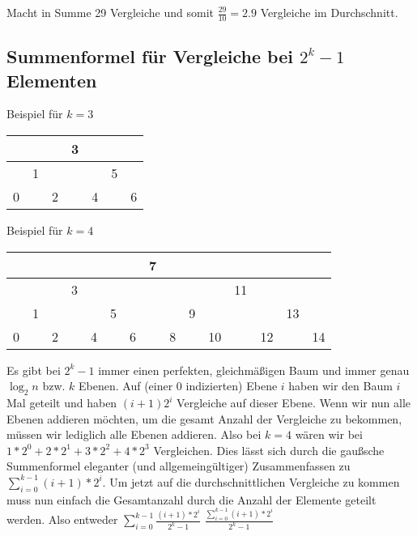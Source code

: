 \documentclass{article}
\begin{document}
\vspace{1em}

Macht in Summe 29 Vergleiche und somit $\frac{29}{10} = 2.9$ Vergleiche im Durchschnitt.

\subsection{Summenformel für Vergleiche bei $2^k - 1$ Elementen}

\begin{center}
	\vspace{1em}

	Beispiel für $k = 3$

	\vspace{1em}

	\begin{tabular}{|c|c|c|c|c|c|c|}
		\hline
		  &   &   & 3 &   &   &   \\
		\hline
		  & 1 &   &   &   & 5 &   \\
		\hline
		0 &   & 2 &   & 4 &   & 6 \\
		\hline
	\end{tabular}

	\vspace{2em}

	Beispiel für $k = 4$

	\vspace{1em}

	\begin{tabular}{|c|c|c|c|c|c|c|c|c|c|c|c|c|c|c|}
		\hline
		  &   &   &   &   &   &   & 7 &   &   &    &    &    &    &    \\
		\hline
		  &   &   & 3 &   &   &   &   &   &   &    & 11 &    &    &    \\
		\hline
		  & 1 &   &   &   & 5 &   &   &   & 9 &    &    &    & 13 &    \\
		\hline
		0 &   & 2 &   & 4 &   & 6 &   & 8 &   & 10 &    & 12 &    & 14 \\
		\hline
	\end{tabular}
\end{center}

\newpage

Es gibt bei $2^k - 1$ immer einen perfekten, gleichmäßigen Baum und immer genau $\log_2n$ bzw. $k$ Ebenen.
Auf (einer 0 indizierten) Ebene $i$ haben wir den Baum $i$ Mal geteilt und haben $(i + 1) 2^i$ Vergleiche
auf dieser Ebene. Wenn wir nun alle Ebenen addieren möchten, um die gesamt Anzahl der Vergleiche zu bekommen,
müssen wir lediglich alle Ebenen addieren. Also bei $k = 4$ wären wir bei $1 * 2^0 + 2 * 2^1 + 3 * 2^2 + 4 * 2^3$
Vergleichen. Dies lässt sich durch die gaußsche Summenformel eleganter (und allgemeingültiger) Zusammenfassen
zu $\sum_{i=0}^{k - 1} (i + 1) * 2^i$. Um jetzt auf die durchschnittlichen Vergleiche zu kommen muss nun einfach
die Gesamtanzahl durch die Anzahl der Elemente geteilt werden. Also entweder $\sum_{i=0}^{k - 1} \frac{(i + 1) * 2^i}{2^k - 1}$
$\frac{\sum_{i=0}^{k - 1} (i + 1) * 2^i}{2^k - 1}$
\end{document}
